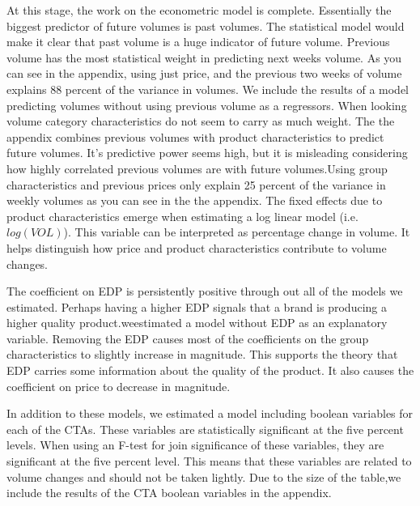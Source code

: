 \documentclass{article}
\begin{document}
At this stage, the work on the econometric model is complete. Essentially the biggest predictor of future volumes is past volumes. The statistical model would make it clear that past volume is a huge indicator of future volume.  Previous volume has the most statistical weight in predicting next weeks volume. As you can see in the appendix, using just price, and the previous two weeks of volume explains 88 percent of the variance in volumes. We include the results of a model predicting volumes without using previous volume as a regressors. When looking volume category characteristics do not seem to carry as much weight. The the appendix combines previous volumes with product characteristics to predict future volumes. It's predictive power seems high, but it is misleading considering how highly correlated previous volumes are with future volumes.Using group characteristics and previous prices only explain 25 percent of the variance in weekly volumes as you can see in the the appendix. The fixed effects due to product characteristics emerge when estimating a log linear model (i.e. $log(VOL)$).  This variable can be interpreted as percentage change in volume. It helps distinguish how price and product characteristics contribute to volume changes. 

The coefficient on EDP is persistently positive through out all of the models we estimated. Perhaps having a higher EDP signals that a brand is producing a higher quality product.weestimated a model without EDP as an explanatory variable. Removing the EDP causes most of the coefficients on the group characteristics to slightly increase in magnitude. This supports the theory that EDP carries some information about the quality of the product. It also causes the coefficient on price to decrease in magnitude.

In addition to these models, we estimated a model including boolean variables for each of the CTAs. These variables are statistically significant at the five percent levels. When using an F-test for join significance of these variables, they are significant at the five percent level. This means that these variables are related to volume changes and should not be taken lightly. Due to the size of the table,we include the results of the CTA boolean variables in the appendix.
\end{document}
